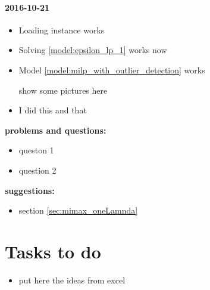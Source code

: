 \documentclass[]{article}
\begin{document}
\subsection{2016-10-21}
\begin{itemize}
\item Loading instance works

\item Solving  \eqref{model:epsilon_lp_1} works now

\item Model \eqref{model:milp_with_outlier_detection}
works


show some pictures here


\item I did this and that
\end{itemize}
{\bf problems and questions:}
\begin{itemize}
\item queston 1
\item question 2

\end{itemize}
{\bf suggestions:}
\begin{itemize}
\item section \ref{sec:mimax_oneLamnda}
\end{itemize}

\newpage
\part{Tasks to do }

\begin{itemize}
\item put here the ideas from excel
\end{itemize}
\end{document}
